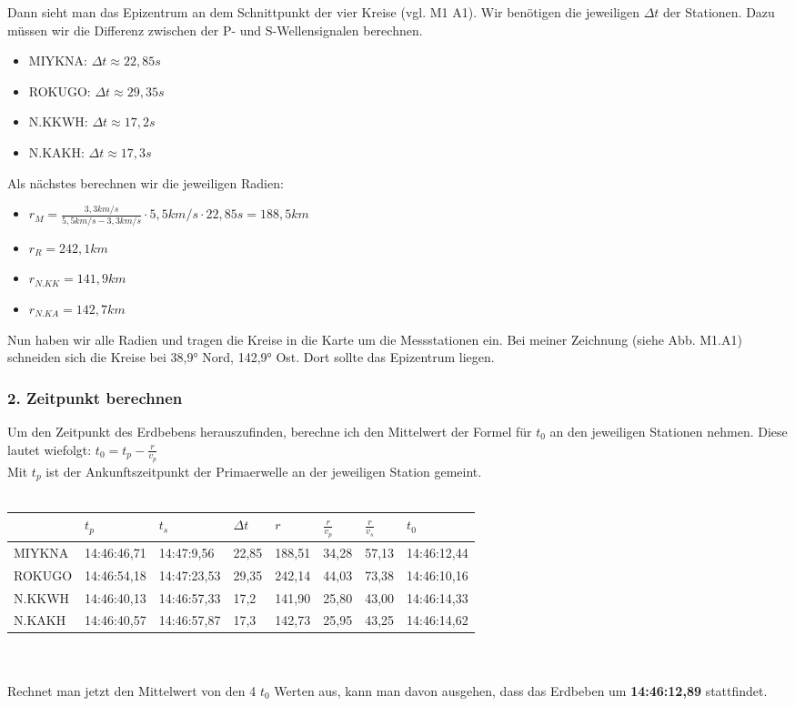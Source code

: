 \documentclass{article}
\begin{document}
Dann sieht man das Epizentrum an dem Schnittpunkt der vier Kreise (vgl. M1 A1). 
Wir benötigen die jeweiligen $\Delta t$ der Stationen. Dazu müssen wir die Differenz zwischen der P- und S-Wellensignalen berechnen.
\begin{itemize}
	\item MIYKNA: $\Delta t \approx 22,85s$ 
	\item ROKUGO: $\Delta t \approx 29,35s$ 
	\item N.KKWH: $\Delta t \approx 17,2s$ 
	\item N.KAKH: $\Delta t \approx 17,3s$ 
\end{itemize}
Als nächstes berechnen wir die jeweiligen Radien: 
\begin{itemize}
	\item $r_M = \frac{3,3km/s}{5,5 km/s - 3,3 km/s} \cdot 5,5 km/s \cdot 22,85 s = 188,5 km$
	\item $r_R = 242,1km$
	\item $r_{N.KK} = 141,9km$
	\item $r_{N.KA} = 142,7km$
\end{itemize}
Nun haben wir alle Radien und tragen die Kreise in die Karte um die Messstationen ein. 
Bei meiner Zeichnung (siehe Abb. M1.A1) schneiden sich die Kreise bei 38,9° Nord, 142,9° Ost. Dort sollte das Epizentrum liegen. 
\subsubsection*{2. Zeitpunkt berechnen}
Um den Zeitpunkt des Erdbebens herauszufinden, berechne ich den Mittelwert der Formel für $t_0$ an den jeweiligen Stationen nehmen. Diese lautet wiefolgt: $t_0 = t_p - \frac{r}{v_p}$\\Mit $t_p$ ist der Ankunftszeitpunkt der Primaerwelle an der jeweiligen Station gemeint.\\\\
\begin{tabular}{l|l|l|l|l|l|l|l}
		   & $t_{p}$         & $t_s$         & $\Delta t$ & $r$      & $\frac{r}{v_p}$    & $\frac{r}{v_s}$    & $t_0$          \\\hline
	MIYKNA & 14:46:46,71 & 14:47:9,56  & 22,85   & 188,51 & 34,28 & 57,13 & 14:46:12,44 \\
	ROKUGO & 14:46:54,18 & 14:47:23,53 & 29,35   & 242,14 & 44,03 & 73,38 & 14:46:10,16 \\
	N.KKWH & 14:46:40,13 & 14:46:57,33 & 17,2    & 141,90 & 25,80 & 43,00 & 14:46:14,33 \\
	N.KAKH & 14:46:40,57 & 14:46:57,87 & 17,3    & 142,73 & 25,95 & 43,25 & 14:46:14,62 
\end{tabular}
\\\\Rechnet man jetzt den Mittelwert von den 4 $t_0$ Werten aus, kann man davon ausgehen, dass das Erdbeben um \textbf{14:46:12,89} stattfindet.
\end{document}
